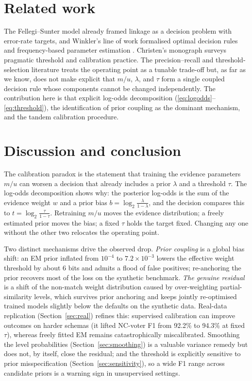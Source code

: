 \documentclass[conference]{IEEEtran}
\begin{document}
\section{Related work}
The Fellegi--Sunter model \cite{fellegi1969} already framed linkage as a decision problem
with error-rate targets, and Winkler's line of work formalised optimal decision rules and
frequency-based parameter estimation \cite{winkler1993,winkler2000}. Christen's monograph
\cite{christen2012} surveys pragmatic threshold and calibration practice. The
precision--recall and threshold-selection literature \cite{davis2006} treats the operating
point as a tunable trade-off but, as far as we know, does not make explicit that $m/u$,
$\lambda$, and $\tau$ form a single coupled decision rule whose components cannot be
changed independently. The contribution here is that explicit log-odds decomposition
(\eqref{eq:logodds}--\eqref{eq:threshold}), the identification of prior coupling as the
dominant mechanism, and the tandem calibration procedure.

\section{Discussion and conclusion}
The calibration paradox is the statement that training the evidence parameters $m/u$ can
worsen a decision that already includes a prior $\lambda$ and a threshold $\tau$. The
log-odds decomposition shows why: the posterior log-odds is the sum of the evidence weight
$w$ and a prior bias $b=\log_2\frac{\lambda}{1-\lambda}$, and the decision compares this to
$t=\log_2\frac{\tau}{1-\tau}$. Retraining $m/u$ moves the evidence distribution; a freely
estimated prior moves the bias; a fixed $\tau$ holds the target fixed. Changing any one
without the other two relocates the operating point.

Two distinct mechanisms drive the observed drop. \emph{Prior coupling} is a global bias
shift: an EM prior inflated from $10^{-4}$ to $7.2\times10^{-3}$ lowers the effective weight
threshold by about $6$ bits and admits a flood of false positives; re-anchoring the prior
recovers most of the loss on the synthetic benchmark. \emph{The genuine residual} is a shift
of the non-match weight distribution caused by over-weighting partial-similarity levels,
which survives prior anchoring and keeps jointly re-optimised trained models slightly below
the defaults on the synthetic data. Real-data replication (Section~\ref{sec:real}) refines
this: supervised calibration can improve outcomes on harder schemas (it lifted NC-voter F1
from 92.2\% to 94.3\% at fixed $\tau$), whereas freely fitted EM remains catastrophically
miscalibrated. Smoothing the level probabilities (Section~\ref{sec:smoothing}) is a
valuable variance remedy but does not, by itself, close the residual; and the threshold is
explicitly sensitive to prior misspecification (Section~\ref{sec:sensitivity}), so a wide
F1 range across candidate priors is a warning sign in unsupervised settings.
\end{document}
